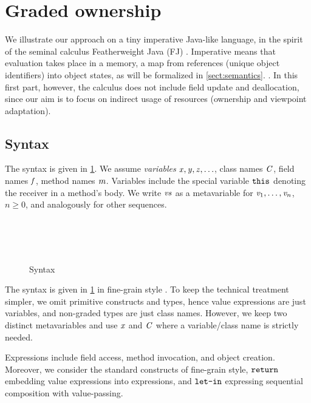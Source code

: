 \section{Graded ownership}

We illustrate our approach on a tiny imperative Java-like language, in the spirit of the seminal calculus Featherweight Java (FJ) \cite{IgarashiPW99}. 
Imperative means that evaluation takes place in a memory, a map from references (unique object identifiers) into object states, as will be formalized in \cref{sect:semantics}. .
In this first part, however, the calculus does not include field update and deallocation, since our aim is to focus on indirect usage of resources (ownership and viewpoint adaptation). 

\subsection{Syntax} 
 The syntax is given in \cref{fig:syntax}. 
We assume \emph{variables} $\mathit{x}, \mathit{y}, \mathit{z}, \ldots$, class names $\mathit{C}$, field names $\mathit{f}$, method names $\mathit{m}$. Variables include the special variable $\texttt{this}$ denoting the receiver in a method's body.
We write $\mathit{vs}$ as  a  metavariable for $\mathit{v}_1, \ldots, \mathit{v}_n$, $n\geq 0$, and analogously for other sequences. 
\begin{figure}
\begin{grammatica}
\\
\\
\\
\end{grammatica}
\caption{Syntax}\label{fig:syntax}
\end{figure}

The syntax is given in \cref{fig:syntax} in fine-grain style \cite{LevyPT03}. 
To keep the technical treatment simpler, we omit primitive constructs and types, hence value expressions are just variables, and non-graded types are just class names.  However, we keep two distinct metavariables and use $\mathit{x}$ and $\mathit{C}$ where a variable/class name is strictly needed.

Expressions include field access, method invocation, and object creation.  Moreover, we consider the standard constructs of fine-grain style, $\texttt{return}$ embedding value expressions into expressions, and $\texttt{let-in}$ expressing sequential composition with value-passing. 

